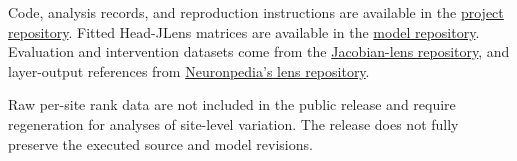 \documentclass[11pt,a4paper]{article}
\begin{document}
Code, analysis records, and reproduction instructions are available in the \href{https://github.com/filippo-merlo/head_level_jlens}{project repository}. Fitted Head-JLens matrices are available in the \href{https://huggingface.co/fmerlo/head-level-jlens}{model repository}. Evaluation and intervention datasets come from the \href{https://github.com/anthropics/jacobian-lens}{Jacobian-lens repository}, and layer-output references from \href{https://huggingface.co/neuronpedia/jacobian-lens}{Neuronpedia's lens repository}.

Raw per-site rank data are not included in the public release and require regeneration for analyses of site-level variation. The release does not fully preserve the executed source and model revisions.
\end{document}
